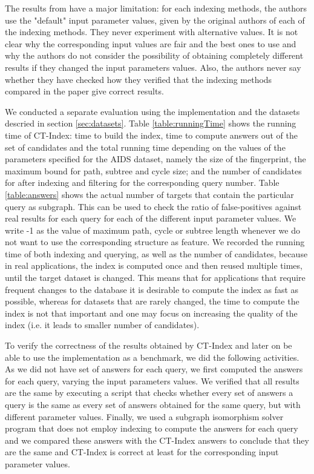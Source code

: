 \documentclass{l4proj}
\begin{document}
The results from \cite{foteini} have a major limitation: for each indexing methods, the authors use the "default" input parameter values, given by the original authors of each of the indexing methods. They never experiment with alternative values. It is not clear why the corresponding input values are fair and the best ones to use and why the authors do not consider the possibility of obtaining completely different results if they changed the input parameters values. Also, the authors never say whether they have checked how they verified that the indexing methods compared in the paper give correct results.\par
We conducted a separate evaluation using the implementation and the datasets descried in section \ref{sec:datasets}. Table \ref{table:runningTime} shows the running time of CT-Index: time to build the index, time to compute answers out of the set of candidates and the total running time depending on the values of the parameters specified for the AIDS dataset, namely the size of the fingerprint, the maximum bound for path, subtree and cycle size; and the number of candidates for after indexing and filtering for the corresponding query number. Table \ref{table:answers} shows the actual number of targets that contain the particular query as subgraph. This can be used to check the ratio of false-positives against real results for each query for each of the different input parameter values. We write -1 as the value of maximum path, cycle or subtree length whenever we do not want to use the corresponding structure as feature. We recorded the running time of both indexing and querying, as well as the number of candidates, because in real applications, the index is computed once and then reused multiple times, until the target dataset is changed. This means that for applications that require frequent changes to the database it is desirable to compute the index as fast as possible, whereas for datasets that are rarely changed, the time to compute the index is not that important and one may focus on increasing the quality of the index (i.e. it leads to smaller number of candidates).\par
To verify the correctness of the results obtained by CT-Index and later on be able to use the implementation as a benchmark, we did the following activities. As we did not have set of answers for each query, we first computed the answers for each query, varying the input parameters values. We verified that all results are the same by executing a script that checks whether every set of answers a query is the same as every set of answers obtained for the same query, but with different parameter values. Finally, we used a subgraph isomorphism solver program that does not employ indexing to compute the answers for each query and we compared these answers with the CT-Index answers to conclude that they are the same and CT-Index is correct at least for the corresponding input parameter values.\par
\end{document}
